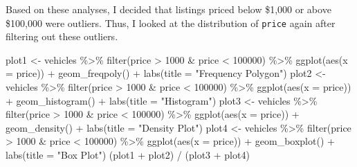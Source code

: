 \documentclass[
]{article}
\newenvironment{Shaded}{\begin{snugshade}}{\end{snugshade}}
\newcommand{\AttributeTok}[1]{\textcolor[rgb]{0.77,0.63,0.00}{#1}}
\newcommand{\DecValTok}[1]{\textcolor[rgb]{0.00,0.00,0.81}{#1}}
\newcommand{\FunctionTok}[1]{\textcolor[rgb]{0.00,0.00,0.00}{#1}}
\newcommand{\NormalTok}[1]{#1}
\newcommand{\OtherTok}[1]{\textcolor[rgb]{0.56,0.35,0.01}{#1}}
\newcommand{\SpecialCharTok}[1]{\textcolor[rgb]{0.00,0.00,0.00}{#1}}
\newcommand{\StringTok}[1]{\textcolor[rgb]{0.31,0.60,0.02}{#1}}
\begin{document}
Based on these analyses, I decided that listings priced below \$1,000 or
above \$100,000 were outliers. Thus, I looked at the distribution of
\texttt{price} again after filtering out these outliers.

\begin{Shaded}
\begin{Highlighting}[]
\NormalTok{plot1 }\OtherTok{\textless{}{-}}\NormalTok{ vehicles }\SpecialCharTok{\%\textgreater{}\%} 
  \FunctionTok{filter}\NormalTok{(price }\SpecialCharTok{\textgreater{}} \DecValTok{1000} \SpecialCharTok{\&}\NormalTok{ price }\SpecialCharTok{\textless{}} \DecValTok{100000}\NormalTok{) }\SpecialCharTok{\%\textgreater{}\%} 
  \FunctionTok{ggplot}\NormalTok{(}\FunctionTok{aes}\NormalTok{(}\AttributeTok{x =}\NormalTok{ price)) }\SpecialCharTok{+} 
  \FunctionTok{geom\_freqpoly}\NormalTok{() }\SpecialCharTok{+} 
  \FunctionTok{labs}\NormalTok{(}\AttributeTok{title =} \StringTok{"Frequency Polygon"}\NormalTok{)}
\NormalTok{plot2 }\OtherTok{\textless{}{-}}\NormalTok{ vehicles }\SpecialCharTok{\%\textgreater{}\%} 
  \FunctionTok{filter}\NormalTok{(price }\SpecialCharTok{\textgreater{}} \DecValTok{1000} \SpecialCharTok{\&}\NormalTok{ price }\SpecialCharTok{\textless{}} \DecValTok{100000}\NormalTok{) }\SpecialCharTok{\%\textgreater{}\%} 
  \FunctionTok{ggplot}\NormalTok{(}\FunctionTok{aes}\NormalTok{(}\AttributeTok{x =}\NormalTok{ price)) }\SpecialCharTok{+} 
  \FunctionTok{geom\_histogram}\NormalTok{() }\SpecialCharTok{+} 
  \FunctionTok{labs}\NormalTok{(}\AttributeTok{title =} \StringTok{"Histogram"}\NormalTok{)}
\NormalTok{plot3 }\OtherTok{\textless{}{-}}\NormalTok{ vehicles }\SpecialCharTok{\%\textgreater{}\%} 
  \FunctionTok{filter}\NormalTok{(price }\SpecialCharTok{\textgreater{}} \DecValTok{1000} \SpecialCharTok{\&}\NormalTok{ price }\SpecialCharTok{\textless{}} \DecValTok{100000}\NormalTok{) }\SpecialCharTok{\%\textgreater{}\%} 
  \FunctionTok{ggplot}\NormalTok{(}\FunctionTok{aes}\NormalTok{(}\AttributeTok{x =}\NormalTok{ price)) }\SpecialCharTok{+} 
  \FunctionTok{geom\_density}\NormalTok{() }\SpecialCharTok{+} 
  \FunctionTok{labs}\NormalTok{(}\AttributeTok{title =} \StringTok{"Density Plot"}\NormalTok{)}
\NormalTok{plot4 }\OtherTok{\textless{}{-}}\NormalTok{ vehicles }\SpecialCharTok{\%\textgreater{}\%} 
  \FunctionTok{filter}\NormalTok{(price }\SpecialCharTok{\textgreater{}} \DecValTok{1000} \SpecialCharTok{\&}\NormalTok{ price }\SpecialCharTok{\textless{}} \DecValTok{100000}\NormalTok{) }\SpecialCharTok{\%\textgreater{}\%} 
  \FunctionTok{ggplot}\NormalTok{(}\FunctionTok{aes}\NormalTok{(}\AttributeTok{x =}\NormalTok{ price)) }\SpecialCharTok{+} 
  \FunctionTok{geom\_boxplot}\NormalTok{() }\SpecialCharTok{+} 
  \FunctionTok{labs}\NormalTok{(}\AttributeTok{title =} \StringTok{"Box Plot"}\NormalTok{)}
\NormalTok{(plot1 }\SpecialCharTok{+}\NormalTok{ plot2) }\SpecialCharTok{/}\NormalTok{ (plot3 }\SpecialCharTok{+}\NormalTok{ plot4)}
\end{Highlighting}
\end{Shaded}
\end{document}
